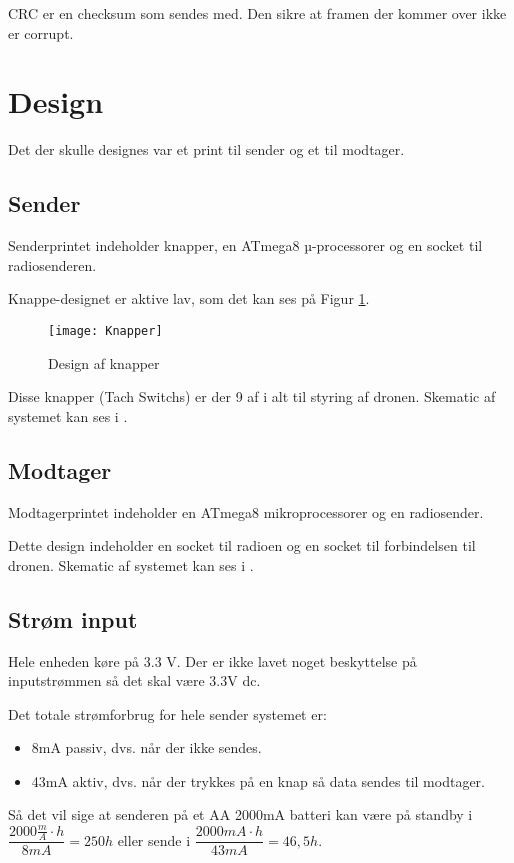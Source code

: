 \documentclass[Main]{subfiles}
\begin{document}
CRC er en checksum som sendes med. 
Den sikre at framen der kommer over ikke er corrupt.



\section{Design}
Det der skulle designes var
et print til sender og et til modtager.

\subsection{Sender}
Senderprintet indeholder knapper, en ATmega8 µ-processorer og en socket til radiosenderen.

Knappe-designet er aktive lav, som det kan ses på Figur \ref{fig: Knapper}.


\begin{figure}[H]
\centering
\texttt{[image: Knapper]}
\caption{Design af knapper}
\label{fig: Knapper}
\end{figure}

Disse knapper (Tach Switchs) er der 9 af i alt til styring af dronen.
Skematic af systemet kan ses i \cite{SenderSCM}.
\subsection{Modtager}
Modtagerprintet indeholder en ATmega8 mikroprocessorer og en radiosender.

Dette design indeholder en socket til radioen og en socket til \itoc forbindelsen til dronen.
Skematic af systemet kan ses i \cite{ModtagerSCM}.


\subsection{Strøm input}

Hele enheden køre på 3.3 V.
Der er ikke lavet noget beskyttelse på inputstrømmen så det skal være 3.3V dc.

Det totale strømforbrug for hele sender systemet er:
\begin{itemize}
\item 8mA passiv, dvs. når der ikke sendes.
\item 43mA aktiv, dvs. når der trykkes på en knap så data sendes til modtager.
\end{itemize}

Så det vil sige at senderen på et AA 2000mA batteri kan være på standby i $\dfrac{2000 \frac mA\cdot h}{8 mA} = 250 h$ eller sende i $\dfrac{2000 mA \cdot h}{43 mA} = 46,5 h$.
\end{document}
